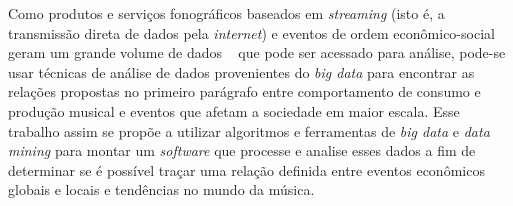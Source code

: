 Como produtos e serviços fonográficos baseados em \textit{streaming} (isto é, a transmissão direta de dados pela \textit{internet}) e eventos de ordem econômico-social geram um grande volume de dados ~\cite{aljanaki15} que pode ser acessado para análise, pode-se usar técnicas de análise de dados provenientes do \textit{big data} para encontrar as relações propostas no primeiro parágrafo entre comportamento de consumo e produção musical e eventos que afetam a sociedade em maior escala. Esse trabalho assim se propõe a utilizar algoritmos e ferramentas de \textit{big data} e \textit{data mining} para montar um \textit{software} que processe e analise esses dados a fim de determinar se é possível traçar uma relação definida entre eventos econômicos globais e locais e tendências no mundo da música.





